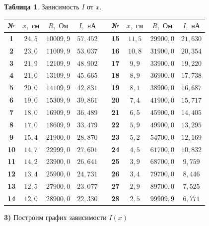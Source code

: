 \documentclass[11pt,a4paper]{article}
\begin{document}
\begin{table}[h!]
	\begin{center}
		\textbf{Таблица 1}. Зависимость $I$ от $x$.\\
	\begin{tabular}{|c|c|c|c|c|c|c|c|c|}
		
			\hline
			№ & $x, \text{ см}$        & $R, \text{ Ом}$  & $I, \text{ нА}$ && № & $x, \text{ см}$        & $R, \text{ Ом}$  & $I, \text{ нА}$ \\ \hline
			\textbf{1} & $24,5$ & $10009,9$ & $57,452$ & &\textbf{15} & $11,5$ & $29900,0$ & $21,630$\\ \hline
			\textbf{2} & $23,0$ & $11009,9$ & $53,037$ & &\textbf{16} & $10,8$ & $31900,0$ & $20,354$ \\ \hline
			\textbf{3} & $21,9$ & $12109,9$ & $48,902$ & &\textbf{17} & $9,9$ & $33900,0$ & $19,220$ \\ \hline
			\textbf{4} & $21,0$ & $13109,9$ & $45,665$ & &\textbf{18} & $8,9$ & $36900,0$ & $17,738$ \\ \hline
			\textbf{5} & $20,0$ & $14109,9$ & $42,831$ & &\textbf{19} & $8,1$ & $38900,0$ & $16,687$ \\ \hline
			\textbf{6} & $19,0$ & $15309,9$ & $39,861$ & &\textbf{20} & $7,4$ & $41900,0$ & $15,717$ \\ \hline
			\textbf{7} & $18,0$ & $16909,9$ & $36,489$ & &\textbf{21} & $6,5$ & $45900,0$ & $14,405$ \\ \hline
			\textbf{8} & $17,0$ & $18609,9$ & $33,479$ & &\textbf{22} & $5,9$ & $49900,0$ & $13,295$ \\ \hline
			\textbf{9} & $15,4$ & $21900,0$ & $28,870$ & &\textbf{23} & $5,2$ & $54700,0$ & $12,169$\\ \hline
			\textbf{10} & $14,7$ & $22999,0$ & $27,601$ & &\textbf{24} & $4,5$ & $61700,0$ & $10,832$ \\ \hline
			\textbf{11} & $14,2$ & $23900,0$ & $26,641$ & &\textbf{25} & $3,9$ & $68700,0$ & $9,759$\\ \hline
			\textbf{12} & $13,4$ & $25900,0$ & $24,731$ & &\textbf{26} & $3,4$ & $79700,0$ & $8,446$ \\ \hline
			\textbf{13} & $12,5$ & $27900,0$ & $23,077$ & &\textbf{27} & $2,9$ & $89700,0$ & $7,525$  \\ \hline
			\textbf{14} & $12,0$ & $28900,0$ & $22,330$ & &\textbf{28} & $2,5$ & $99909,9$ & $6,771$ \\ \hline		
	\end{tabular}
	\end{center}
\end{table}
\space
\textbf{3)} Построим графих зависимости $I(x)$
\end{document}
